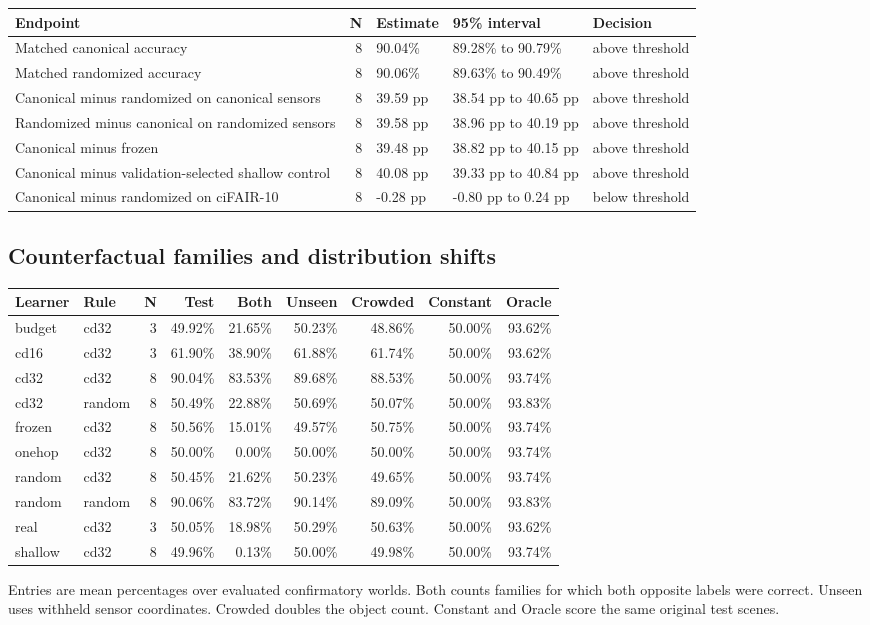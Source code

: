 \documentclass[10pt]{article}
\begin{document}
\begin{longtable}{p{.37\linewidth}rp{.11\linewidth}p{.17\linewidth}l}
\hline Endpoint & N & Estimate & 95\% interval & Decision\\\hline\endhead\hline\endfoot
Matched canonical accuracy & 8 & 90.04\% & 89.28\% to 90.79\% & above threshold\\
Matched randomized accuracy & 8 & 90.06\% & 89.63\% to 90.49\% & above threshold\\
Canonical minus randomized on canonical sensors & 8 & 39.59 pp & 38.54 pp to 40.65 pp & above threshold\\
Randomized minus canonical on randomized sensors & 8 & 39.58 pp & 38.96 pp to 40.19 pp & above threshold\\
Canonical minus frozen & 8 & 39.48 pp & 38.82 pp to 40.15 pp & above threshold\\
Canonical minus validation-selected shallow control & 8 & 40.08 pp & 39.33 pp to 40.84 pp & above threshold\\
Canonical minus randomized on ciFAIR-10 & 8 & -0.28 pp & -0.80 pp to 0.24 pp & below threshold\\
\end{longtable}
\subsection*{Counterfactual families and distribution shifts}
\begin{longtable}{llrrrrrrr}
\hline Learner & Rule & N & Test & Both & Unseen & Crowded & Constant & Oracle\\\hline\endhead\hline\endfoot
budget & cd32 & 3 & 49.92\% & 21.65\% & 50.23\% & 48.86\% & 50.00\% & 93.62\%\\
cd16 & cd32 & 3 & 61.90\% & 38.90\% & 61.88\% & 61.74\% & 50.00\% & 93.62\%\\
cd32 & cd32 & 8 & 90.04\% & 83.53\% & 89.68\% & 88.53\% & 50.00\% & 93.74\%\\
cd32 & random & 8 & 50.49\% & 22.88\% & 50.69\% & 50.07\% & 50.00\% & 93.83\%\\
frozen & cd32 & 8 & 50.56\% & 15.01\% & 49.57\% & 50.75\% & 50.00\% & 93.74\%\\
onehop & cd32 & 8 & 50.00\% & 0.00\% & 50.00\% & 50.00\% & 50.00\% & 93.74\%\\
random & cd32 & 8 & 50.45\% & 21.62\% & 50.23\% & 49.65\% & 50.00\% & 93.74\%\\
random & random & 8 & 90.06\% & 83.72\% & 90.14\% & 89.09\% & 50.00\% & 93.83\%\\
real & cd32 & 3 & 50.05\% & 18.98\% & 50.29\% & 50.63\% & 50.00\% & 93.62\%\\
shallow & cd32 & 8 & 49.96\% & 0.13\% & 50.00\% & 49.98\% & 50.00\% & 93.74\%\\
\end{longtable}
Entries are mean percentages over evaluated confirmatory worlds. Both counts families for which both opposite labels were correct. Unseen uses withheld sensor coordinates. Crowded doubles the object count. Constant and Oracle score the same original test scenes.
\end{document}
